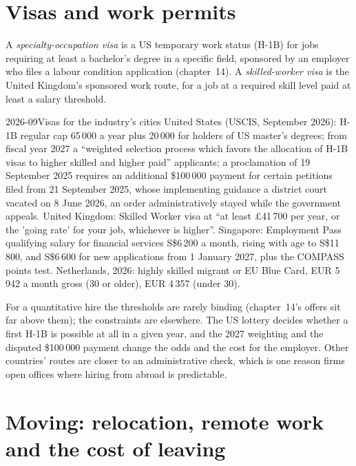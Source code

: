 \section{Visas and work permits}

\begin{definition}\label{def:in:locations:visas}
A \emph{specialty-occupation visa} is a US temporary work status (H-1B) for jobs
requiring at least a bachelor's degree in a specific field, sponsored by an employer who files a labour condition
application (chapter~14). A \emph{skilled-worker visa} is the United Kingdom's sponsored work
route, for a job at a required skill level paid at least a salary threshold.
\end{definition}

\begin{dated}{2026-09}{Visas for the industry's cities}\label{dat:in:locations:visas}
United States (USCIS, September 2026): H-1B regular cap 65\,000 a year plus 20\,000 for holders of US master's degrees;
from fiscal year 2027 a ``weighted selection process which favors the allocation of H-1B visas to higher skilled and
higher paid'' applicants; a proclamation of 19 September 2025 requires an additional \$100\,000 payment for certain
petitions filed from 21 September 2025, whose implementing guidance a district court vacated on 8 June 2026, an order
administratively stayed while the government appeals. United Kingdom: Skilled Worker visa at ``at least \pounds 41\,700
per year, or the 'going rate' for your job, whichever is higher''. Singapore: Employment Pass qualifying salary for
financial services S\$6\,200 a month, rising with age to S\$11\,800, and S\$6\,600 for new applications from 1 January
2027, plus the COMPASS points test. Netherlands, 2026: highly skilled migrant or EU Blue Card, EUR 5\,942 a month gross
(30 or older), EUR 4\,357 (under 30).
\end{dated}

For a quantitative hire the thresholds are rarely binding (chapter~14's offers sit far above them); the constraints are
elsewhere. The US lottery decides whether a first H-1B is possible at all in a given year, and the 2027 weighting and the
disputed \$100\,000 payment change the odds and the cost for the employer. Other countries' routes are closer to an
administrative check, which is one reason firms open offices where hiring from abroad is predictable.

\section{Moving: relocation, remote work and the cost of leaving}

